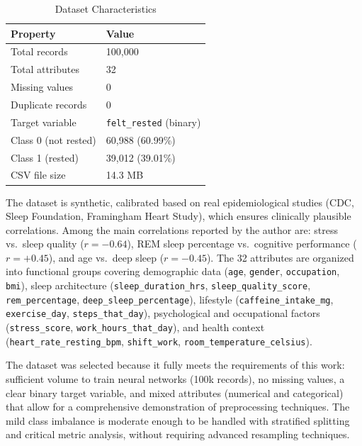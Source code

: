 \documentclass[conference]{IEEEtran}
\begin{document}
\begin{table}[!ht]
\caption{Dataset Characteristics}
\label{tab:dataset_info}
\centering
\begin{tabular}{ll}
\toprule
\textbf{Property} & \textbf{Value} \\
\midrule
Total records         & 100,000 \\
Total attributes      & 32 \\
Missing values        & 0 \\
Duplicate records     & 0 \\
Target variable       & \texttt{felt\_rested} (binary) \\
Class 0 (not rested)  & 60,988 (60.99\%) \\
Class 1 (rested)      & 39,012 (39.01\%) \\
CSV file size         & 14.3 MB \\
\bottomrule
\end{tabular}
\end{table}

The dataset is synthetic, calibrated based on real epidemiological studies (CDC, Sleep Foundation, Framingham Heart Study), which ensures clinically plausible correlations. Among the main correlations reported by the author are: stress vs.\ sleep quality ($r = -0.64$), REM sleep percentage vs.\ cognitive performance ($r = +0.45$), and age vs.\ deep sleep ($r = -0.45$). The 32 attributes are organized into functional groups covering demographic data (\texttt{age}, \texttt{gender}, \texttt{occupation}, \texttt{bmi}), sleep architecture (\texttt{sleep\_duration\_hrs}, \texttt{sleep\_quality\_score}, \texttt{rem\_percentage}, \texttt{deep\_sleep\_percentage}), lifestyle (\texttt{caffeine\_intake\_mg}, \texttt{exercise\_day}, \texttt{steps\_that\_day}), psychological and occupational factors (\texttt{stress\_score}, \texttt{work\_hours\_that\_day}), and health context (\texttt{heart\_rate\_resting\_bpm}, \texttt{shift\_work}, \texttt{room\_temperature\_celsius}).

The dataset was selected because it fully meets the requirements of this work: sufficient volume to train neural networks (100k records), no missing values, a clear binary target variable, and mixed attributes (numerical and categorical) that allow for a comprehensive demonstration of preprocessing techniques. The mild class imbalance is moderate enough to be handled with stratified splitting and critical metric analysis, without requiring advanced resampling techniques.

\end{document}
